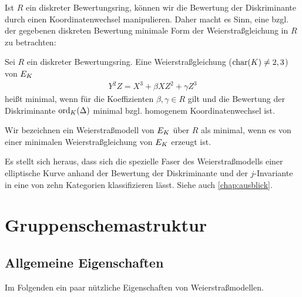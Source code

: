 \documentclass[german, bibliography=totoc]{scrreprt}
\renewcommand*{\optcite}[2][]{}
\begin{document}
Ist $R$ ein diskreter Bewertungsring, können wir die Bewertung der
Diskriminante durch einen Koordinatenwechsel manipulieren. Daher macht
es Sinn, eine bzgl. der gegebenen diskreten Bewertung minimale
Form der Weierstraßgleichung in $R$ zu betrachten:
\begin{Definition}
  \optcite[Chapter 1.5, S.\,22]{neron}
  \optcite[Chapter VII.1]{silverman}
  Sei $R$ ein diskreter Bewertungsring.
  Eine Weierstraßgleichung ($\operatorname{char}(K)\neq2,3$) von $E_{K}$
  \begin{gather*}
    Y^2Z = X^3 + \beta XZ^2 + \gamma Z^3
  \end{gather*}
  heißt minimal, wenn für die Koeffizienten $\beta, \gamma\in R$ gilt
  und die Bewertung der Diskriminante $\operatorname{ord}_{K}(\Delta)$ minimal
  bzgl. homogenem Koordinatenwechsel ist.

  Wir bezeichnen ein Weierstraßmodell von $E_{K}$ über $R$ als minimal,
  wenn es von einer minimalen Weierstraßgleichung von $E_{K}$ erzeugt
  ist.
\end{Definition}
Es stellt sich heraus, dass sich die spezielle Faser des
Weierstraßmodells einer elliptische Kurve anhand der
Bewertung der Diskriminante und der $j$-Invariante in eine von zehn
Kategorien klassifizieren lässt. Siehe auch \autoref{chap:ausblick}. 


\section{Gruppenschemastruktur}\label{chap:weierstraßgruppe}
\subsection{Allgemeine Eigenschaften}
Im Folgenden ein paar nützliche Eigenschaften von Weierstraßmodellen.
\end{document}
